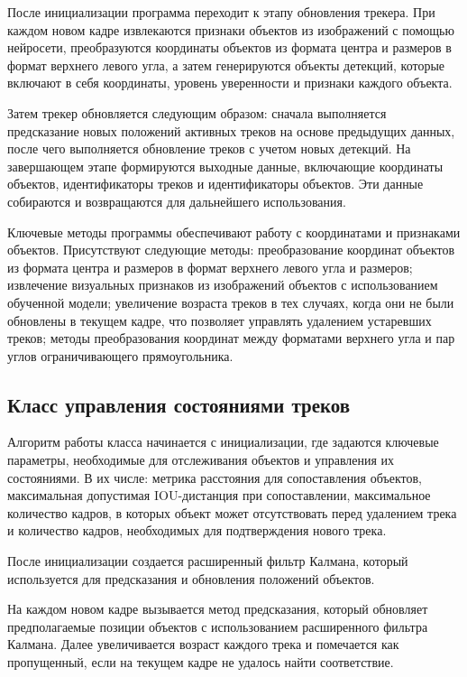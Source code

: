 После инициализации программа переходит к этапу обновления трекера. При каждом новом кадре извлекаются признаки объектов из изображений с помощью нейросети, преобразуются координаты объектов из формата центра и размеров  в формат верхнего левого угла, а затем генерируются объекты детекций, которые включают в себя координаты, уровень уверенности и признаки каждого объекта.

Затем трекер обновляется следующим образом: сначала выполняется предсказание новых положений активных треков на основе предыдущих данных, после чего выполняется обновление треков с учетом новых детекций. На завершающем этапе формируются выходные данные, включающие координаты объектов, идентификаторы треков и идентификаторы объектов. Эти данные собираются и возвращаются для дальнейшего использования.

Ключевые методы программы обеспечивают работу с координатами и признаками объектов. Присутствуют следующие методы: преобразование координат объектов из формата центра и размеров в формат верхнего левого угла и размеров; извлечение визуальных признаков из изображений объектов с использованием обученной модели; увеличение возраста треков в тех случаях, когда они не были обновлены в текущем кадре, что позволяет управлять удалением устаревших треков; методы преобразования координат между форматами верхнего угла и пар углов ограничивающего прямоугольника.

\subsection{Класс управления состояниями треков}

Алгоритм работы класса начинается с инициализации, где задаются ключевые параметры, необходимые для отслеживания объектов и управления их состояниями. В их числе: метрика расстояния для сопоставления объектов, максимальная допустимая IOU-дистанция при сопоставлении, максимальное количество кадров, в которых объект может отсутствовать перед удалением трека и количество кадров, необходимых для подтверждения нового трека.

После инициализации создается расширенный фильтр Калмана, который используется для предсказания и обновления положений объектов.

На каждом новом кадре вызывается метод предсказания, который обновляет предполагаемые позиции объектов с использованием расширенного фильтра Калмана. Далее увеличивается возраст каждого трека и помечается как пропущенный, если на текущем кадре не удалось найти соответствие.

